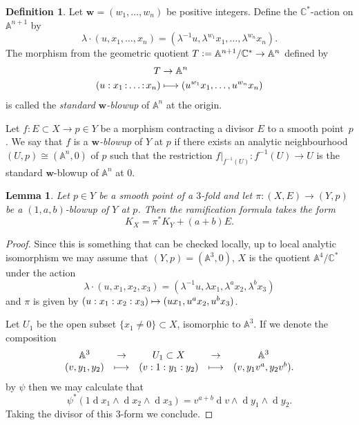 \documentclass[JEP,XML,SOM,Unicode,published]{cedram}
\newcommand\mto{\mathchoice{\longmapsto}{\mapsto}{\mapsto}{\mapsto}}
\let\dpl\displaystyle
\theoremstyle{plain}
\newtheorem{lemma}[theorem]{Lemma}
\theoremstyle{definition}
\newtheorem{definition}[theorem]{Definition}
\newcommand{\CC}{\mathbb{C}}
\renewcommand{\AA}{\mathbb{A}}
\let\isom\cong
\newcommand{\defeq}{\vcentcolon=}
\renewcommand{\d}[1]{\ensuremath{\operatorname{d}\!{#1}}}
\begin{document}

\begin{definition}\label{weighted blowup}
Let $\boldsymbol{w} = (w_1,\dots,w_n)$ be positive integers. Define the $\CC^*$-action on $\AA^{n+1}$ by
\[
\lambda\cdot (u,x_1,\dots,x_n) = (\lambda^{-1}u,\lambda^{w_1}x_1,\dots,\lambda^{w_n}x_n).
\]
The morphism from the geometric quotient $T \defeq \AA^{n+1}/\CC^* \to \AA^n$ defined by
\begin{align*}
T & \to \AA^n\\
(u:x_1\,{:}\dots{:}\,x_n) & \mto (u^{w_1}x_1,\dots, u^{w_n}x_n)
\end{align*}
is called the \emph{standard} $\boldsymbol{w}$\emph{-blowup} of $\AA^n$ at the origin.

Let $f\colon E \subset X \to p \in Y$ be a morphism contracting a divisor $E$ to a smooth point~$p$. We say that $f$ is a $\boldsymbol{w}$\emph{-blowup} of $Y$ at $p$ if there exists an analytic neighbourhood $(U,p) \isom (\AA^n,0)$ of $p$ such that the restriction $f|_{f^{-1}(U)}\colon f^{-1}(U) \to U$ is the standard $\boldsymbol{w}$-blowup of $\AA^n$ at $0$.
\end{definition}

\begin{lemma}\label{Discrepancy of (1,a,b)-blowup}
Let $p \in Y$ be a smooth point of a $3$-fold and let $\pi\colon (X,E) \to (Y,p)$ be a $(1,a,b)$-blowup of $Y$ at $p$. Then the ramification formula takes the form
\[
K_X = \pi^*K_Y + (a+b)E.
\]
\end{lemma}

\begin{proof}
Since this is something that can be checked locally, up to local analytic isomorphism we may assume that $(Y,p) = (\AA^3,0)$, $X$ is the quotient $\AA^4/\CC^*$ under the action
\[
\lambda\cdot (u,x_1,x_2,x_3) = (\lambda^{-1}u,\lambda x_1, \lambda^a x_2, \lambda^b x_3)
\]
and $\pi$ is given by $(u:x_1:x_2:x_3) \mto (ux_1,u^ax_2,u^bx_3)$.

Let $U_1$ be the open subset $\{x_1 \neq 0\} \subset X$, isomorphic to $\AA^3$. If we denote the composition
\[
\begin{array}{ccccc}
\AA^3 & \dpl\to & U_1 \subset X & \dpl\to & \AA^3\\
(v,y_1,y_2) & \dpl\mto & \left(v:1:y_1:y_2\right) & \dpl\mto & (v,y_1v^a,y_2v^b).
\end{array}
\]
by $\psi$ then we may calculate that
\[
\psi^*(1\d x_1\wedge \d x_2 \wedge \d x_3) = v^{a+b}\d v\wedge \d y_1 \wedge \d y_2.
\]
Taking the divisor of this $3$-form we conclude.
\end{proof}
\end{document}
